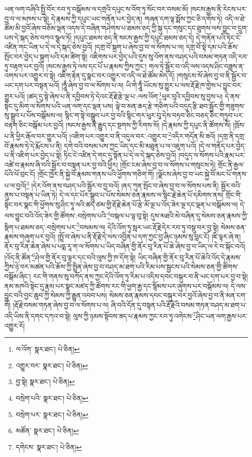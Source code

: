 ཡན་ལག་བཞིའི་སྤྱི་བོར་རབ་ཏུ་བསྒོམས་ལ་དགྲའི་དཔུང་ས་འོག་ཏུ་སོང་བར་བསམ་མོ། །སངས་རྒྱས་ནི་རེངས་པར་བྱ་བ་ལ་མཁས་པ་སྟེ། དེ་རྣམས་ཀྱི་དཔུང་ཡང་གནོན་པར་བྱེད་ན། གཞན་དག་ལྟ་སྨོས་ཀྱང་ཅི་དགོས་ཏེ། འདི་ལ་ཐེ་ཚོམ་མི་བྱའོ་ཞེས་བཅོམ་ལྡན་འདས་དེ་བཞིན་གཤེགས་པ་ཐམས་ཅད་ཀྱི་སྐུ་དང་གསུང་དང་ཐུགས་ལས་བྱུང་བ་དྲུག་པས་དེ་སྐད་ཅེས་བཀའ་སྩལ་ཏོ། །དཔུང་ཐམས་ཅད་ནི་སངས་རྒྱས་ཀྱི་དཔུང་ཐམས་ཅད་དེ། དེ་གནོན་པའི་ཏིང་ངེ་འཛིན་གང་ཡིན་པ་དེ་ལ་དེ་སྐད་ཅེས་བྱའོ། །དགྲ་བོ་སྐྲག་པ་ཞེས་བྱ་བ་ལ་སོགས་པ་ལ། དགྲ་བོ་སྟེ་དམ་པའི་ཆོས་སྤོང་བར་བྱེད་པ་སྐྲག་པའི་དམ་ཚིག་སྟེ། འཇིགས་པར་བྱེད་པའི་དུས་སུ་འོག་ནས་བཤད་པའི་བསམ་གཏན་འདི་རབ་ཏུ་བརྟག་པར་བྱའོ། །སངས་རྒྱས་ཏེ་ལས་དང་པོ་པ་རྣམས་ཀྱིས་ཀྱང་། གལ་ཏེ་སྦྱོར་བ་འདི་ལས་འདས་ཤིང་བཟླས་ན་འགས་པར་འགྱུར་བ་སྟེ། འཇིག་རྟེན་དུ་སྣང་བར་འགྱུར་བ་འདི་ལ་ཐེ་ཚོམ་མེད་དོ། །གསུངས་སོ་ཞེས་བྱ་བ་ནི་སྦྱོར་བ་ཡང་དག་པར་བསྟན་པའོ། །ཧཱུྃ་ཞེས་བྱ་བ་ལ་སོགས་པ་ལ། ཡི་གེ་ཧཱུྃ་ཡོངས་སུ་གྱུར་པ་ལས་རྡོ་རྗེ་ཁ་གྱེས་པ་བྱུང་བར་གྱུར་པའོ། །ཚད་དུ་སྟེ་ཞེས་པ་ནི་དབྱིབས་ཏེ་དེའང་རྡོ་རྗེ་རྩེ་ལྔ་པ་:ལས་འོག་\footnote{ལ་འོག་  སྣར་ཐང་།  པེ་ཅིན། }ཕུར་བུའི་དབྱིབས་སུ་བྱས་པ། དེ་ནས་སྟེང་དུ་མིག་ལ་སོགས་པའི་ཡན་ལག་དང་ལྡན་པས། ལྟེ་བ་མན་ཆད་རྩེ་གཅིག་པའི་བདུད་རྩི་ཐབ་སྦྱོར་གྱི་གཟུགས་སུ་སྒྲུབ་པ་པོས་བསྒོམས་ལ། སྙིང་ག་སྟེ་བསྒྲུབ་པར་བྱ་བའི་སྙིང་གར་ཕུར་བུ་དེས་བཏབ་ཅིང་བཅད་ཅིང་གཏུབ་པར་བརྟག་ཅིང་བསྒོམ་པར་བྱའོ། །སངས་རྒྱས་ནི་རྒྱུད་དང་སྔགས་ཀྱི་རིགས་སོ། །དེ་རྣམས་ཀྱི་དཔུང་ནི་ཚོགས་སོ། །ཁྲོས་པ་ནི་ཕྱིར་རྒོལ་བར་གྱུར་པའོ། །འཇིག་པར་འགྱུར་བ་ནི་འདུལ་བར་:འགྱུར་བ་\footnote{འགྱུར་བར་  སྣར་ཐང་།  པེ་ཅིན། }འདིར་གདོན་མི་ཟའོ། །དགྲ་ནི་དགྲ་བོ་རྣམས་ཏེ་དེ་རྨོངས་པ་ནི། དགེ་བའི་བསམ་པས་ཀྱང་ཡིད་དང་མི་མཐུན་པ་ལ་འཇུག་པའོ། །དེ་ལ་གནོད་པར་བྱེད་པ་ནི་འཇིག་པར་བྱེད་པ་སྟེ། ཏིང་ངེ་འཛིན་དེ་གང་དུ་སྟོན་པ་དེ་ལ་དེ་སྐད་ཅེས་བྱའོ། །བདུད་ལ་སོགས་པའི་རྣམ་པར་འཚེ་བ་རྣམས་ཞི་བའི་སྦྱོར་བ་བསྟན་པར་བྱ་བའི་ཕྱིར། །གྲོང་ངམ་ཞེས་བྱ་བ་ལ་སོགས་པ་གསུངས་ཏེ། གྲོང་ནི་རྒྱལ་པོའི་ཕོ་བྲང་ངོ། །གྲོང་ཁྱེར་ནི་སྐྱེ་བོ་རྣམས་གནས་པའི་ཕྱོགས་གཅིག་གོ། །ལྗོངས་ཞེས་བྱ་བ་ཡང་སྐྱེ་བོ་མང་པོ་གནས་པ་ལ་བྱའོ།\footnote{བྱ་སྟེ།  སྣར་ཐང་།  པེ་ཅིན། } །དེར་འོག་ནས་བཤད་པའི་སྦྱོར་བ་བྱ་བའོ། །ནད་ཀུན་སྤོང་བ་ཞེས་བྱ་བ་ལ་སོགས་པས་ནི། སྦྱོར་བའི་ནུས་པ་བསྟན་པ་ཡིན་ཏེ། དེ་ལ་དང་པོར་སྒྲུབ་པ་པོས་སེམས་ཅན་རྣམས་ལ་སྙིང་རྗེ་ཆེན་པོ་དམིགས་ནས། གྲོང་གི་སྟེང་བར་སྣང་གི་ཕྱོགས་སུ་ཤིང་ཏཱ་ལའི་ཚད་ཙམ་གྱི་རྡོ་རྗེ་ཆེན་པོ་རྩེ་མོ་ལྔ་པ་འོད་ཟེར་ལྔ་དང་ལྡན་པ་བསྒོམས་ལ། དེ་ལས་བྱུང་བའི་འོད་ཟེར་གྱི་ཚོགས་:བསྲེགས་པའི་\footnote{བསྲེག་པའི་  སྣར་ཐང་།  པེ་ཅིན། }བསྐལ་པ་ལྟ་བུ་སྟེ། དུས་མཐའི་མེ་བཞིན་དུ་སེམས་ཅན་རྣམས་ཀྱི་སྡིག་པ་ཐམས་ཅད་:བསྲེགས་པར་\footnote{བསྲེག་པར་  སྣར་ཐང་།  པེ་ཅིན། }བསམས་ལ། དེའི་འོག་ཏུ་སླར་ཡང་རྡོ་རྗེ་དེར་རབ་ཏུ་བསྡུ་བར་བྱ་སྟེ། སེམས་ཅན་རྣམས་གཞུག་པར་བྱའོ། །སྤྲོ་བ་ཞེས་པ་ནི་རྡོ་རྗེ་དེ་ལས་འབྱིན་པ་དག་ཀྱང་བྱ་ཞིང་ཉམས་སུ་བླང་ངོ། །ཇི་ལྟར་ཞེ་ན། ནོར་བུ་རིན་ཆེན་ཞེས་པ་པདྨ་རཱ་ག་ལ་སོགས་པ་ཡིད་བཞིན་གྱི་ནོར་བུ་རིན་པོ་ཆེ་ཞེས་བྱ་བ་ཡིད་ལ་རེ་བ་སྐོང་བའོ། །འོད་ནི་ཚོན་\footnote{མཚོན་  སྣར་ཐང་།  པེ་ཅིན། }ཤེལ་གྱི་ནོར་བུ་ལྟར་དང་བའི་ལུས་ཀྱི་ཁ་དོག་སྟེ། ཡིད་བཞིན་གྱི་ནོར་བུ་རིན་པོ་ཆེའི་འོད་དེ་རྣམས་ཀྱིས་ཉེ་བར་མཚན་པའི་ཆོས་ཀྱི་སྤྲིན་ཞེས་བྱ་བ་བཤད་མ་ཐག་པའི་རིམ་པས་སྦྱངས་པའི་སེམས་ཅན་གྱི་ཚོགས་བསྒོམ་ཞིང་། རང་གི་གནས་སུ་བཀོད་ནས་ཀྱང་དེའི་འོག་ཏུ་རིམ་པ་འདིས་དབང་བསྐུར་བ་ནི་ཡང་དག་པར་བྱ་བ་སྟེ། ནམ་མཁའི་སྟེང་དུ་རྣམ་པར་སྣང་མཛད་ཀྱི་ཚོགས་རང་གི་ཕྱག་རྒྱ་དང་སྙོམས་པར་ཞུགས་པར་བསྒོམས་ལ། དེ་ལས་བྱུང་བའི་བྱང་ཆུབ་ཀྱི་སེམས་ཀྱི་རྒྱུན་འབབ་པས། སེམས་ཅན་རྣམས་དབང་བསྐུར་བར་བྱའོ་ཞེས་བྱ་བ་ནི་མན་ངག་གོ། །རྡོ་རྗེ་བསམ་གཏན་ཞེས་བྱ་བ་ལ་སོགས་པ་ལ། ཞི་བའི་དོན་དུ་བསྟན་པའི་རྡོ་རྗེའི་བསམ་གཏན་བཤད་མ་ཐག་པ་འདི་ཡིས་ནི་དགང་དཀའ་བ་སྟེ། ལུས་ཀྱི་ཉམས་སྟོབས་ཟད་པ་རྣམས་ཀྱང་རབ་ཏུ་འགེངས་\footnote{དགེངས་  སྣར་ཐང་།  པེ་ཅིན། }ཤིང་ཡན་ལག་རྒྱས་པར་འགྱུར་རོ། 